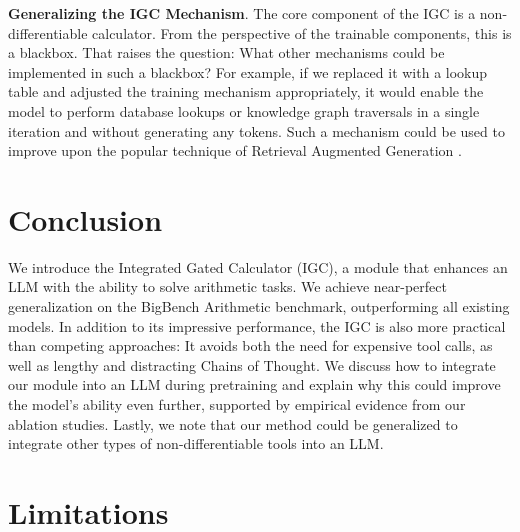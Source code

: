 \documentclass[11pt]{article}
\begin{document}
\textbf{Generalizing the IGC Mechanism}.
The core component of the IGC is a non-differentiable calculator. From the perspective of the trainable components, this is a blackbox.
That raises the question: What other mechanisms could be implemented in such a blackbox?
For example, if we replaced it with a lookup table and adjusted the training mechanism appropriately, it would enable the model to perform database lookups or knowledge graph traversals in a single iteration and without generating any tokens.
Such a mechanism could be used to improve upon the popular technique of Retrieval Augmented Generation \citep{lewis2020retrieval}.



\section{Conclusion}


We introduce the Integrated Gated Calculator (IGC), a module that enhances an LLM with the ability to solve arithmetic tasks.
We achieve near-perfect generalization on the BigBench Arithmetic benchmark, outperforming all existing models.
In addition to its impressive performance, the IGC is also more practical than competing approaches: It avoids both the need for expensive tool calls, as well as lengthy and distracting Chains of Thought.
We discuss how to integrate our module into an LLM during pretraining and explain why this could improve the model's ability even further, supported by empirical evidence from our ablation studies.
Lastly, we note that our method could be generalized to integrate other types of non-differentiable tools into an LLM.





\section{Limitations}
\label{section-limitations}
\end{document}
